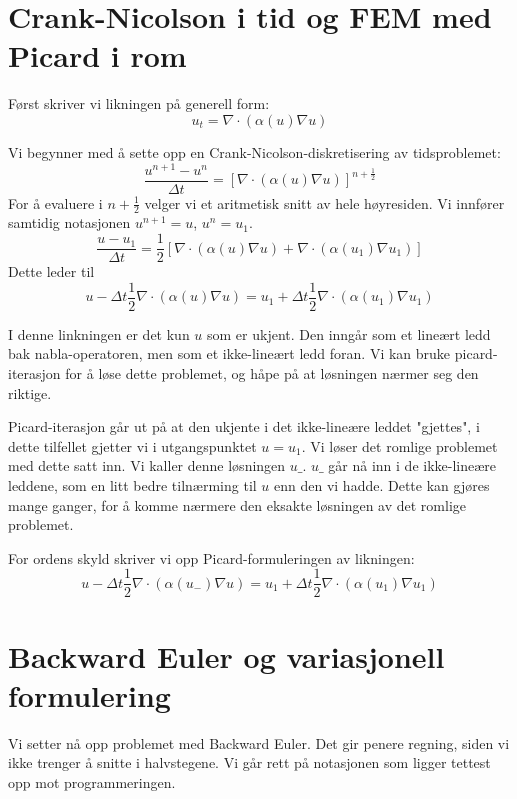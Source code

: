 \documentclass[a4paper, 10pt]{article}
\newcommand{\half}{\frac{1}{2}}
\begin{document}
\section{Crank-Nicolson i tid og FEM med Picard i rom}
Først skriver vi likningen på generell form:
\begin{equation}
	u_t = \nabla \cdot(\alpha(u)\nabla u)
\end{equation}

Vi begynner med å sette opp en Crank-Nicolson-diskretisering av tidsproblemet:
\begin{equation}
\frac{u^{n+1}- u^n}{\Delta t} = \left[\nabla \cdot (\alpha(u)\nabla u)\right]^{n+\half}
\end{equation}
For å evaluere i $n+\half$ velger vi et aritmetisk snitt av hele høyresiden. Vi innfører samtidig notasjonen $u^{n+1} = u$, $u^n = u_1$.
\begin{equation}
  \frac{u- u_1}{\Delta t} = \half\left[ \nabla \cdot (\alpha(u)\nabla u) + \nabla \cdot (\alpha(u_1) \nabla u_1) \right]
\end{equation}  
Dette leder til 
\begin{equation}
	u - \Delta t\half \nabla \cdot (\alpha(u)\nabla u) = u_1 + \Delta t\half \nabla \cdot (\alpha(u_1)\nabla u_1)
\end{equation}

I denne linkningen er det kun $u$ som er ukjent. Den inngår som et lineært ledd bak nabla-operatoren, men som et ikke-lineært ledd foran. Vi kan bruke picard-iterasjon for å løse dette problemet, og håpe på at løsningen nærmer seg den riktige. 

Picard-iterasjon går ut på at den ukjente i det ikke-lineære leddet "gjettes", i dette tilfellet gjetter vi i utgangspunktet $u = u_1$. Vi løser det romlige problemet med dette satt inn. Vi kaller denne løsningen $u\_$. $u\_$ går nå inn i de ikke-lineære leddene, som en litt bedre tilnærming til $u$ enn den vi hadde. Dette kan gjøres mange ganger, for å komme nærmere den eksakte løsningen av det romlige problemet. 

For ordens skyld skriver vi opp Picard-formuleringen av likningen:
\begin{equation}
	u - \Delta t\half \nabla \cdot (\alpha(u_-)\nabla u) = u_1 + \Delta t\half \nabla \cdot (\alpha(u_1)\nabla u_1)
\end{equation}


\section{Backward Euler og variasjonell formulering}
Vi setter nå opp problemet med Backward Euler. Det gir penere regning, siden vi ikke trenger å snitte i halvstegene. Vi går rett på notasjonen som ligger tettest opp mot programmeringen. 
\end{document}

